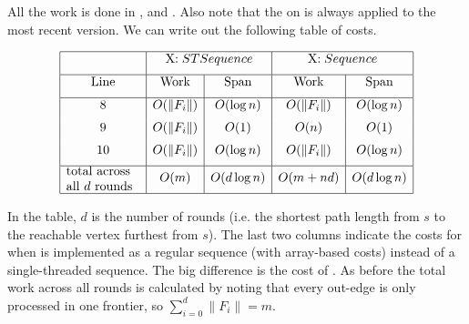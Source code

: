 All the work is done in ,
and .  Also note that the  on
 is always applied to the most recent version. 
%
We can write out the following table of costs.

\[
\begin{array}{|c|c|c|c|c|}
\hline
 & \multicolumn{2}{c|}{$X$ : ST Sequence} &
\multicolumn{2}{c|}{$X$ : Sequence}
\\[2mm]
\hline
\mbox{Line} & \mbox{Work} & \mbox{Span} & \mbox{Work} & \mbox{Span} 
\\[2mm]
\hline
8 & O(\|F_i\|) & O(\log n) & O(\|F_i\|) & O(\log n) 
\\[2mm]
9 & O(\|F_i\|) & O(1) & O(n) & O(1) 
\\[2mm]
10 & O(\|F_i\|) & O(\log n) & O(\|F_i\|) & O(\log n) \\[2mm]
\hline
\parbox{.8in}{total across\\ all $d$ rounds} & O(m) & O(d \log n) &
O(m + nd) & O(d \log n) 
\\[2mm]
\hline
\end{array}
\]

In the table, $d$ is the number of rounds (i.e. the shortest path
length from $s$ to the reachable vertex furthest from $s$).  
%
The last two columns indicate the costs for when  is
implemented as a regular sequence (with array-based costs) instead of
a single-threaded sequence.  
%
The big difference is the cost of .  As before the total
work across all rounds is calculated by noting that every out-edge is
only processed in one frontier, so $\sum_{i=0}^d \|F_i\| = m$.


